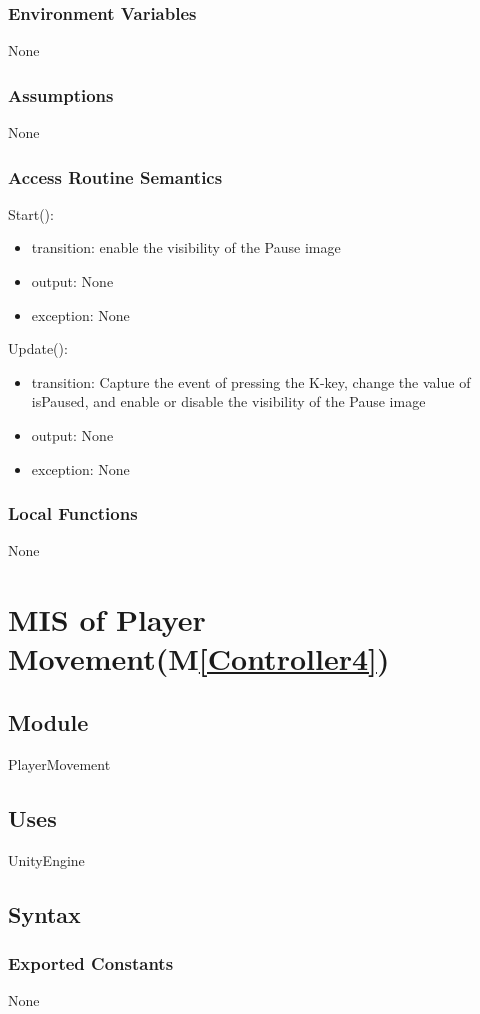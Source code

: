 \documentclass[12pt, titlepage]{article}
\newcommand{\mref}[1]{M\ref{#1}}
\begin{document}
\subsubsection{Environment Variables}
None

\subsubsection{Assumptions}
None

\subsubsection{Access Routine Semantics}
Start():
\begin{itemize}
    \item transition: enable the visibility of the Pause image
    \item output: None
    \item exception: None
\end{itemize}
Update():
\begin{itemize}
    \item transition: Capture the event of pressing the K-key, change the value of isPaused, and enable or disable the visibility of the Pause image  
    \item output: None
    \item exception: None
\end{itemize}
\subsubsection{Local Functions}
None
\newpage

\section{MIS of Player Movement(\mref{Controller4})} \subsection{Module}
PlayerMovement
\subsection{Uses}
UnityEngine
\subsection{Syntax}

\subsubsection{Exported Constants}
None
\end{document}
